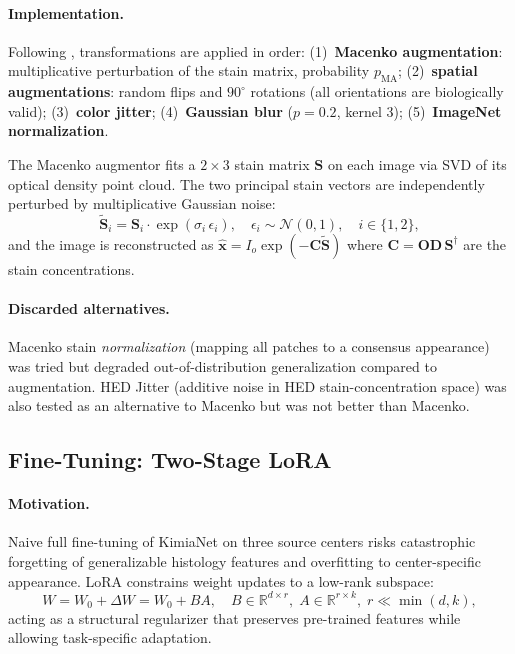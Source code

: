 \documentclass{midl}
\begin{document}
\paragraph{Implementation.}
Following \citet{howard2021}, transformations are applied in order: 
(1)~\textbf{Macenko augmentation}: multiplicative perturbation of the stain matrix,
probability $p_{\text{MA}}$; (2)~\textbf{spatial augmentations}: random flips and
$90^{\circ}$ rotations (all orientations are biologically valid); (3)~\textbf{color
jitter}; (4)~\textbf{Gaussian blur} ($p=0.2$, kernel 3); (5)~\textbf{ImageNet
normalization}. 

The Macenko augmentor \citep{macenko2009} fits a $2\times3$ stain matrix $\mathbf{S}$ on each image
via SVD of its optical density point cloud. The two principal stain vectors are
independently perturbed by multiplicative Gaussian noise:
\[
    \tilde{\mathbf{S}}_i = \mathbf{S}_i \cdot \exp(\sigma_i\,\epsilon_i),\quad
    \epsilon_i \sim \mathcal{N}(0,1),\quad i\in\{1,2\},
\]
and the image is reconstructed as $\hat{\mathbf{x}} = I_o\exp(-\mathbf{C}\tilde{\mathbf{S}})$
where $\mathbf{C} = \mathbf{OD}\,\mathbf{S}^{\dagger}$ are the stain concentrations.

\paragraph{Discarded alternatives.}
Macenko stain \emph{normalization} (mapping all patches to a consensus appearance) was
tried but degraded out-of-distribution generalization compared to augmentation. HED
Jitter (additive noise in HED stain-concentration space) was also tested as an alternative to Macenko but was not better than Macenko.

\subsection{Fine-Tuning: Two-Stage LoRA}

\paragraph{Motivation.}
Naive full fine-tuning of KimiaNet on three source centers risks catastrophic forgetting of
generalizable histology features and overfitting to center-specific appearance. LoRA
\citep{hu2022lora} constrains weight updates to a low-rank subspace:
\[
    W = W_0 + \Delta W = W_0 + BA,\quad B\in\mathbb{R}^{d\times r},\;
    A\in\mathbb{R}^{r\times k},\;r\ll\min(d,k),
\]
acting as a structural regularizer that preserves pre-trained features while allowing
task-specific adaptation.
\end{document}
